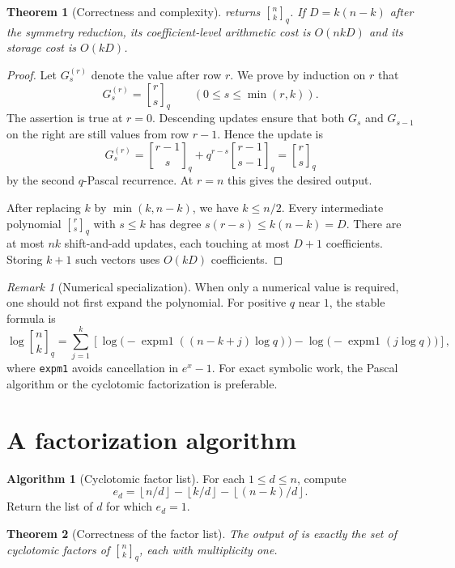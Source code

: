 \documentclass[11pt,oneside,openany]{book}
\newtheorem{theorem}{Theorem}[chapter]
\theoremstyle{definition}
\newtheorem{algorithm}[algorithm]{Algorithm}
\theoremstyle{remark}
\newtheorem{remark}[remark]{Remark}
\newcommand{\qbinom}[2]{\genfrac{[}{]}{0pt}{}{#1}{#2}_{q}}
\newcommand{\Qbinom}[3]{\genfrac{[}{]}{0pt}{}{#1}{#2}_{#3}}
\newcommand{\floor}[1]{\left\lfloor #1\right\rfloor}
\begin{document}
\begin{theorem}[Correctness and complexity]\label{thm:gaussian-dp-correct}
 returns $\qbinom nk$.  If $D=k(n-k)$ after the symmetry reduction, its coefficient-level arithmetic cost is $O(nkD)$ and its storage cost is $O(kD)$.
\end{theorem}

\begin{proof}
Let $G_s^{(r)}$ denote the value after row $r$.  We prove by induction on $r$ that
\[
 G_s^{(r)}=\Qbinom rsq
 \qquad(0\le s\le\min(r,k)).
\]
The assertion is true at $r=0$.  Descending updates ensure that both $G_s$ and $G_{s-1}$ on the right are still values from row $r-1$.  Hence the update is
\[
 G_s^{(r)}
 =\Qbinom{r-1}{s}q+q^{r-s}\Qbinom{r-1}{s-1}q
 =\Qbinom rsq
\]
by the second $q$-Pascal recurrence.  At $r=n$ this gives the desired output.

After replacing $k$ by $\min(k,n-k)$, we have $k\le n/2$.  Every intermediate polynomial $\Qbinom rsq$ with $s\le k$ has degree $s(r-s)\le k(n-k)=D$.  There are at most $nk$ shift-and-add updates, each touching at most $D+1$ coefficients.  Storing $k+1$ such vectors uses $O(kD)$ coefficients.
\end{proof}

\begin{remark}[Numerical specialization]
When only a numerical value is required, one should not first expand the polynomial.  For positive $q$ near $1$, the stable formula is
\[
 \log\qbinom nk
 =\sum_{j=1}^{k}
 \left[\log\bigl(-\operatorname{expm1}((n-k+j)\log q)\bigr)
      -\log\bigl(-\operatorname{expm1}(j\log q)\bigr)\right],
\]
where \texttt{expm1} avoids cancellation in $e^x-1$.  For exact symbolic work, the Pascal algorithm or the cyclotomic factorization is preferable.
\end{remark}

\section{A factorization algorithm}

\begin{algorithm}[Cyclotomic factor list]\label{alg:cyclotomic-list}
For each $1\le d\le n$, compute
\[
 e_d=\floor{n/d}-\floor{k/d}-\floor{(n-k)/d}.
\]
Return the list of $d$ for which $e_d=1$.
\end{algorithm}

\begin{theorem}[Correctness of the factor list]\label{thm:cyclotomic-list-correct}
The output of  is exactly the set of cyclotomic factors of $\qbinom nk$, each with multiplicity one.
\end{theorem}
\end{document}

